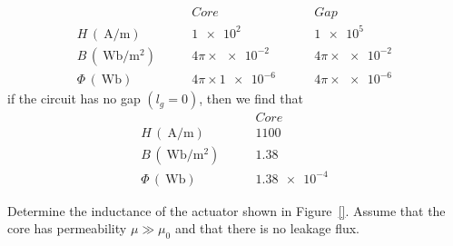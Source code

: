 \documentclass[12pt,a4paper,oneside]{book}
\begin{document}
\begin{onehalfspace}
\begin{example}
\begin{equation*}
	\boxed{\begin{matrix}
		\quad&\quad Core \quad&\quad Gap \\[6pt]
		H\,(\SI{}{\ampere\per\meter}) \quad&\quad \SI{1e2}{} \quad&\quad \SI{1e5}{} \\[6pt]
		B\,(\SI{}{\weber\per\square\meter}) \quad&\quad 4\pi\times\SI{e-2}{} \quad&\quad 4\pi\times\SI{e-2}{} \\[6pt]
		\Phi\,(\SI{}{\weber}) \quad&\quad 4\pi\times\SI{1e-6}{} \quad&\quad 4\pi\times\SI{e-6}{}
	\end{matrix}}
\end{equation*}
if the circuit has no gap $(l_g=0)$, then we find that
\begin{equation*}
	\boxed{\begin{matrix}
			\quad&\quad Core \\[6pt]
			H\,(\SI{}{\ampere\per\meter}) \quad&\quad \SI{1100}{} \\[6pt]
			B\,(\SI{}{\weber\per\square\meter}) \quad&\quad \SI{1.38}{} \\[6pt]
			\Phi\,(\SI{}{\weber}) \quad&\quad \SI{1.38 e-4}{}
	\end{matrix}}
\end{equation*}
\end{example}

\begin{example}
	Determine the inductance of the actuator shown in Figure~\ref{}. Assume that the core has permeability $\mu\gg\mu_0$ and that there is no leakage flux.
	

\end{example}
\end{onehalfspace}
\end{document}
